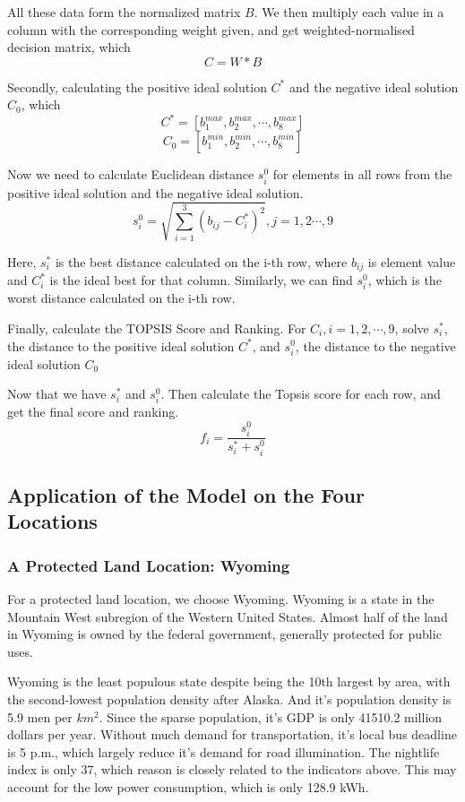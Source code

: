All these data form the normalized matrix $B$. We then multiply each value in a column with the corresponding weight given, and get weighted-normalised decision matrix, which $$C=W*B$$

Secondly, calculating the positive ideal solution $C^*$ and the negative ideal solution $C_0$, which$$C^*=[b_1^{max},b_2^{max},\cdots,b_8^{max}]$$ $$C_0=[b_1^{min},b_2^{min},\cdots,b_8^{min}]$$

Now we need to calculate Euclidean distance $s_i^{0}$ for elements in all rows from the positive ideal solution and the negative ideal solution.$$s_i^{0}=\sqrt{\sum_{i=1}^{3}(b_{ij}-C_i^{*})^{2}},j=1,2\cdots,9$$

Here, $s_i^*$ is the best distance calculated on the i-th row, where $b_{ij}$ is element value and $C_i^{*}$ is the ideal best for that column. Similarly, we can find $s_i^0$, which is the worst distance calculated on the i-th row.

Finally, calculate the TOPSIS Score and Ranking. For $C_i,i=1,2,\cdots,9$, solve $s_i^*$, the distance to the positive ideal solution $C^*$, and $s_i^0$, the distance to the negative ideal solution $C_0$

Now that we have $s_i^*$ and $s_i^0$. Then calculate the Topsis score for each row, and get the final score and ranking. $$f_i=\frac{s_i^0}{s_i^*+s_i^0}$$

\subsection{Application of the Model on the Four Locations}


\subsubsection{A Protected Land Location: Wyoming}
For a protected land location, we choose Wyoming. Wyoming is a state in the Mountain West subregion of the Western United States. Almost half of the land in Wyoming is owned by the federal government, generally protected for public uses.

Wyoming is the least populous state despite being the 10th largest by area, with the second-lowest population density after Alaska. And it's population density is 5.9 men per $km^2$. Since the sparse population, it's GDP is only 41510.2 million dollars per year. Without much demand for transportation, it's local bus deadline is 5 p.m., which largely reduce it's demand for road illumination. The nightlife index is only 37, which reason is closely related to the indicators above. This may account for the low power consumption, which is only 128.9 kWh. 

